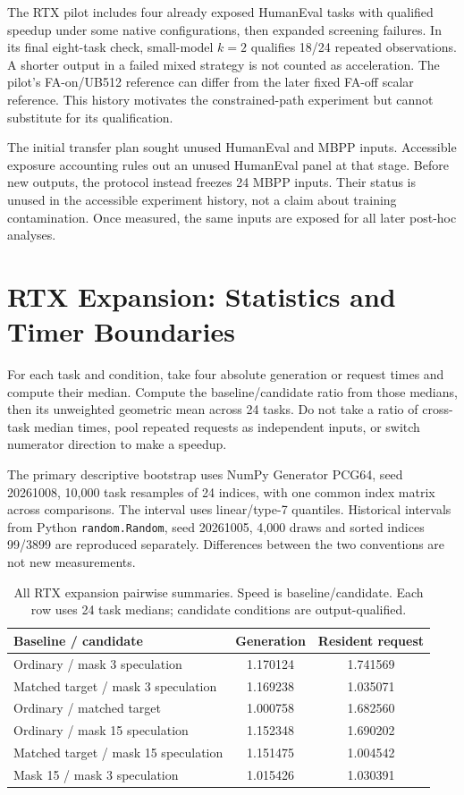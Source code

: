 The RTX pilot includes four already exposed HumanEval tasks with qualified speedup under some native configurations, then expanded screening failures. In its final eight-task check, small-model $k=2$ qualifies 18/24 repeated observations. A shorter output in a failed mixed strategy is not counted as acceleration. The pilot's FA-on/UB512 reference can differ from the later fixed FA-off scalar reference. This history motivates the constrained-path experiment but cannot substitute for its qualification.

The initial transfer plan sought unused HumanEval and MBPP inputs. Accessible exposure accounting rules out an unused HumanEval panel at that stage. Before new outputs, the protocol instead freezes 24 MBPP inputs. Their status is unused in the accessible experiment history, not a claim about training contamination. Once measured, the same inputs are exposed for all later post-hoc analyses.

\section{RTX Expansion: Statistics and Timer Boundaries}
For each task and condition, take four absolute generation or request times and compute their median. Compute the baseline/candidate ratio from those medians, then its unweighted geometric mean across 24 tasks. Do not take a ratio of cross-task median times, pool repeated requests as independent inputs, or switch numerator direction to make a speedup.

The primary descriptive bootstrap uses NumPy Generator PCG64, seed 20261008, 10,000 task resamples of 24 indices, with one common index matrix across comparisons. The interval uses linear/type-7 quantiles. Historical intervals from Python \texttt{random.Random}, seed 20261005, 4,000 draws and sorted indices 99/3899 are reproduced separately. Differences between the two conventions are not new measurements.

\begin{table}[htbp]\centering\small
\caption{All RTX expansion pairwise summaries. Speed is baseline/candidate. Each row uses 24 task medians; candidate conditions are output-qualified.}
\begin{tabular}{lcc}\toprule
Baseline / candidate & Generation & Resident request\\\midrule
Ordinary / mask 3 speculation & 1.170124 & 1.741569\\
Matched target / mask 3 speculation & 1.169238 & 1.035071\\
Ordinary / matched target & 1.000758 & 1.682560\\
Ordinary / mask 15 speculation & 1.152348 & 1.690202\\
Matched target / mask 15 speculation & 1.151475 & 1.004542\\
Mask 15 / mask 3 speculation & 1.015426 & 1.030391\\\bottomrule
\end{tabular}\end{table}

